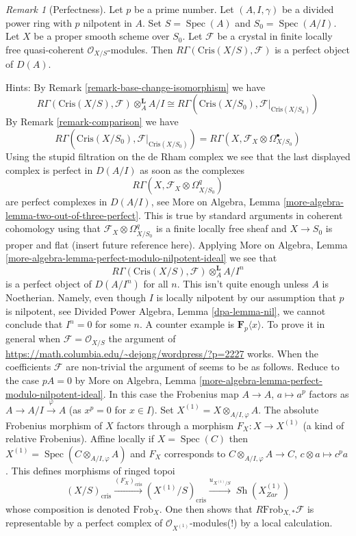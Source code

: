 \documentclass{stacks-project}
\theoremstyle{plain}
\theoremstyle{definition}
\theoremstyle{remark}
\newtheorem{remark}[subsection]{Remark}
\numberwithin{equation}{subsection}
\def\Spec{\mathop{\mathrm{Spec}}}
\def\Sh{\mathop{\mathit{Sh}}\nolimits}
\begin{document}
\begin{remark}[Perfectness]
\label{remark-perfect}
Let $p$ be a prime number. Let $(A, I, \gamma)$ be a divided power
ring with $p$ nilpotent in $A$. Set $S = \Spec(A)$ and
$S_0 = \Spec(A/I)$. Let $X$ be a proper smooth scheme over $S_0$.
Let $\mathcal{F}$ be a crystal in finite locally free
quasi-coherent $\mathcal{O}_{X/S}$-modules.
Then $R\Gamma(\text{Cris}(X/S), \mathcal{F})$ is a
perfect object of $D(A)$.

\medskip\noindent
Hints: By Remark \ref{remark-base-change-isomorphism} we have
$$
R\Gamma(\text{Cris}(X/S), \mathcal{F}) \otimes_A^\mathbf{L} A/I
\cong
R\Gamma(\text{Cris}(X/S_0), \mathcal{F}|_{\text{Cris}(X/S_0)})
$$
By Remark \ref{remark-comparison} we have
$$
R\Gamma(\text{Cris}(X/S_0), \mathcal{F}|_{\text{Cris}(X/S_0)}) =
R\Gamma(X, \mathcal{F}_X \otimes \Omega^\bullet_{X/S_0})
$$
Using the stupid filtration on the de Rham complex we see that
the last displayed complex is perfect in $D(A/I)$ as soon as the complexes
$$
R\Gamma(X, \mathcal{F}_X \otimes \Omega^q_{X/S_0})
$$
are perfect complexes in $D(A/I)$, see
More on Algebra, Lemma \ref{more-algebra-lemma-two-out-of-three-perfect}.
This is true by standard arguments
in coherent cohomology using that $\mathcal{F}_X \otimes \Omega^q_{X/S_0}$
is a finite locally free sheaf and $X \to S_0$ is proper and flat
(insert future reference here). Applying
More on Algebra, Lemma \ref{more-algebra-lemma-perfect-modulo-nilpotent-ideal}
we see that
$$
R\Gamma(\text{Cris}(X/S), \mathcal{F}) \otimes_A^\mathbf{L} A/I^n
$$
is a perfect object of $D(A/I^n)$ for all $n$. This isn't quite enough
unless $A$ is Noetherian. Namely, even though $I$ is locally nilpotent
by our assumption that $p$ is nilpotent, see
Divided Power Algebra, Lemma \ref{dpa-lemma-nil},
we cannot conclude that $I^n = 0$ for some $n$. A counter example
is $\mathbf{F}_p\langle x \rangle$. To prove it in general when
$\mathcal{F} = \mathcal{O}_{X/S}$ the argument of
\url{https://math.columbia.edu/~dejong/wordpress/?p=2227}
works. When the coefficients $\mathcal{F}$ are non-trivial the
argument of \cite{Faltings-very} seems to be as follows. Reduce to the
case $pA = 0$ by More on Algebra, Lemma
\ref{more-algebra-lemma-perfect-modulo-nilpotent-ideal}.
In this case the Frobenius map $A \to A$, $a \mapsto a^p$ factors
as $A \to A/I \xrightarrow{\varphi} A$ (as $x^p = 0$ for $x \in I$). Set
$X^{(1)} = X \otimes_{A/I, \varphi} A$. The absolute Frobenius morphism
of $X$ factors through a morphism $F_X : X \to X^{(1)}$ (a kind of
relative Frobenius). Affine locally if $X = \Spec(C)$ then
$X^{(1)} = \Spec( C \otimes_{A/I, \varphi} A)$
and $F_X$ corresponds to $C \otimes_{A/I, \varphi} A \to C$,
$c \otimes a \mapsto c^pa$. This defines morphisms of ringed topoi
$$
(X/S)_{\text{cris}}
\xrightarrow{(F_X)_{\text{cris}}}
(X^{(1)}/S)_{\text{cris}}
\xrightarrow{u_{X^{(1)}/S}}
\Sh(X^{(1)}_{Zar})
$$
whose composition is denoted $\text{Frob}_X$. One then shows that
$R\text{Frob}_{X, *}\mathcal{F}$ is representable by a
perfect complex of $\mathcal{O}_{X^{(1)}}$-modules(!)
by a local calculation.
\end{remark}
\end{document}
